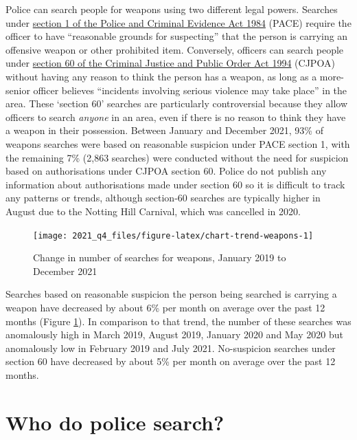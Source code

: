 \documentclass[
  a4paper,
  twoside, 11pt]{article}
\begin{document}
Police can search people for weapons using two different legal powers. Searches under \href{https://www.legislation.gov.uk/ukpga/1984/60/section/1}{section 1 of the Police and Criminal Evidence Act 1984} (PACE) require the officer to have ``reasonable grounds for suspecting'' that the person is carrying an offensive weapon or other prohibited item. Conversely, officers can search people under \href{https://www.legislation.gov.uk/ukpga/1994/33/section/60}{section 60 of the Criminal Justice and Public Order Act 1994} (CJPOA) without having any reason to think the person has a weapon, as long as a more-senior officer believes ``incidents involving serious violence may take place'' in the area. These `section 60' searches are particularly controversial because they allow officers to search \emph{anyone} in an area, even if there is no reason to think they have a weapon in their possession. Between January and December 2021, 93\% of weapons searches were based on reasonable suspicion under PACE section 1, with the remaining 7\% (2,863 searches) were conducted without the need for suspicion based on authorisations under CJPOA section 60. Police do not publish any information about authorisations made under section 60 so it is difficult to track any patterns or trends, although section-60 searches are typically higher in August due to the Notting Hill Carnival, which was cancelled in 2020.



\begin{figure}[tb]

{\centering \texttt{[image: 2021\_q4\_files/figure-latex/chart-trend-weapons-1]} 

}

\caption{Change in number of searches for weapons, January 2019 to December 2021}\label{fig:chart-trend-weapons}
\end{figure}

Searches based on reasonable suspicion the person being searched is carrying a weapon have decreased by about 6\% per month on average over the past 12 months (Figure \ref{fig:chart-trend-weapons}). In comparison to that trend, the number of these searches was anomalously high in March 2019, August 2019, January 2020 and May 2020 but anomalously low in February 2019 and July 2021.
No-suspicion searches under section 60 have decreased by about 5\% per month on average over the past 12 months.

\hypertarget{who-do-police-search}{%
\section{Who do police search?}\label{who-do-police-search}}
\end{document}

